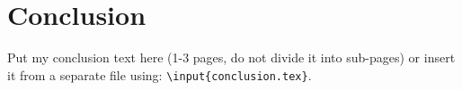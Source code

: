 \chapter*{Conclusion \TODO} %

Put my conclusion text here (1-3 pages, do not divide it into sub-pages) or insert it from a separate file using: \texttt{\textbackslash input\{conclusion.tex\}}.

